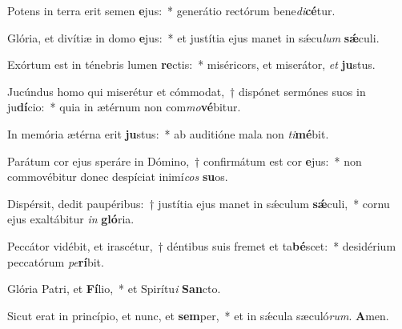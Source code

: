 ﻿\item Potens in terra erit semen \textbf{e}jus:~* generátio rectórum bene\textit{di}\textbf{cé}tur.
\item Glória, et divítiæ in domo \textbf{e}jus:~* et justítia ejus manet in sǽcu\textit{lum} \textbf{sǽ}culi.
\item Exórtum est in ténebris lumen \textbf{re}ctis:~* miséricors, et miserátor, \textit{et} \textbf{ju}stus.
\item Jucúndus homo qui miserétur et cómmodat,~† dispónet sermónes suos in ju\textbf{dí}cio:~* quia in ætérnum non com\textit{mo}\textbf{vé}bitur.
\item In memória ætérna erit \textbf{ju}stus:~* ab auditióne mala non \textit{ti}\textbf{mé}bit.
\item Parátum cor ejus speráre in Dómino,~† confirmátum est cor \textbf{e}jus:~* non commovébitur donec despíciat inimí\textit{cos} \textbf{su}os.
\item Dispérsit, dedit pau\-pé\-ri\-bus:~† justítia ejus manet in sǽculum \textbf{sǽ}culi,~* cornu ejus exaltábitur \textit{in} \textbf{gló}ria.
\item Peccátor vidébit, et irascétur,~† déntibus suis fremet et ta\textbf{bé}scet:~* desidérium peccatórum \textit{pe}\textbf{rí}bit.
\item Glória Patri, et \textbf{Fí}lio,~* et Spirítu\textit{i} \textbf{San}cto.
\item Sicut erat in princípio, et nunc, et \textbf{sem}per,~* et in sǽcula sæculó\textit{rum}. \textbf{A}men.
